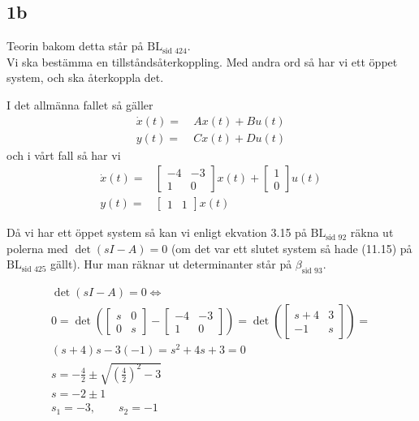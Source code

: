 \documentclass[a4paper]{article}
\newcommand{\mhb}[1]{$\beta_{\text{#1}}$}     %
\newcommand{\bl}[1]{$\text{BL}_{\text{#1}}$}  %
\begin{document}
\subsection{1b}
Teorin bakom detta står på \bl{sid 424}.\\

Vi ska bestämma en tillståndsåterkoppling. Med andra ord så har vi ett öppet system, och ska återkoppla det.

I det allmänna fallet så gäller
\begin{align*}
  \dot{x}(t) =~& Ax(t) + Bu(t) \\
  y(t) =~& Cx(t) + Du(t)
\end{align*}
och i vårt fall så har vi
\begin{align*}
  \dot{x}(t) =& \begin{bmatrix}-4 & -3 \\ 1 & 0\end{bmatrix} x(t) + \begin{bmatrix}1 \\ 0\end{bmatrix} u(t) \\
  y(t) =& \begin{bmatrix}1 & 1\end{bmatrix} x(t)
\end{align*}


Då vi har ett öppet system så kan vi enligt ekvation 3.15 på \bl{sid 92} räkna ut polerna med $\det(sI-A) = 0$ (om det var ett slutet system så hade (11.15) på \bl{sid 425} gällt). Hur man räknar ut determinanter står på \mhb{sid 93}.

\begin{align*}
  \det(sI-A) = 0 \Longleftrightarrow \\
  0 = \det \left( \begin{bmatrix}s & 0 \\ 0 & s\end{bmatrix} - \begin{bmatrix}-4 & -3 \\ 1 & 0\end{bmatrix} \right) = \det \left( \begin{bmatrix}s+4 & 3 \\ -1 & s\end{bmatrix} \right) =\\
  (s+4)s - 3(-1) = s^2 + 4s + 3 = 0\\
  s=-\frac{4}{2} \pm \sqrt{\left(\frac{4}{2}\right)^2 - 3}\\
  s=-2 \pm 1\\
  s_1=-3, \qquad s_2=-1
\end{align*}
\end{document}

